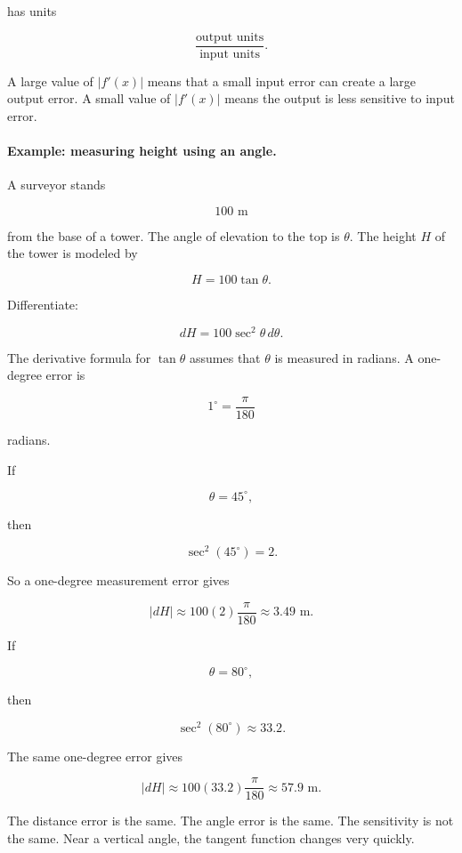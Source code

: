 has units

\[
\frac{\text{output units}}{\text{input units}}.
\]

A large value of \(|f'(x)|\) means that a small input error can create a large output
error.  A small value of \(|f'(x)|\) means the output is less sensitive to input error.

\paragraph{Example: measuring height using an angle.}
A surveyor stands

\[
100\text{ m}
\]

from the base of a tower.  The angle of elevation to the top is \(\theta\).  The height
\(H\) of the tower is modeled by

\[
H=100\tan\theta.
\]

Differentiate:

\[
dH=100\sec^2\theta\,d\theta.
\]

The derivative formula for \(\tan\theta\) assumes that \(\theta\) is measured in radians.
A one-degree error is

\[
1^\circ=\frac{\pi}{180}
\]

radians.

If

\[
\theta=45^\circ,
\]

then

\[
\sec^2(45^\circ)=2.
\]

So a one-degree measurement error gives

\[
|dH|
\approx
100(2)\frac{\pi}{180}
\approx
3.49\text{ m}.
\]

If

\[
\theta=80^\circ,
\]

then

\[
\sec^2(80^\circ)\approx33.2.
\]

The same one-degree error gives

\[
|dH|
\approx
100(33.2)\frac{\pi}{180}
\approx
57.9\text{ m}.
\]

The distance error is the same.  The angle error is the same.  The sensitivity is not
the same.  Near a vertical angle, the tangent function changes very quickly.

